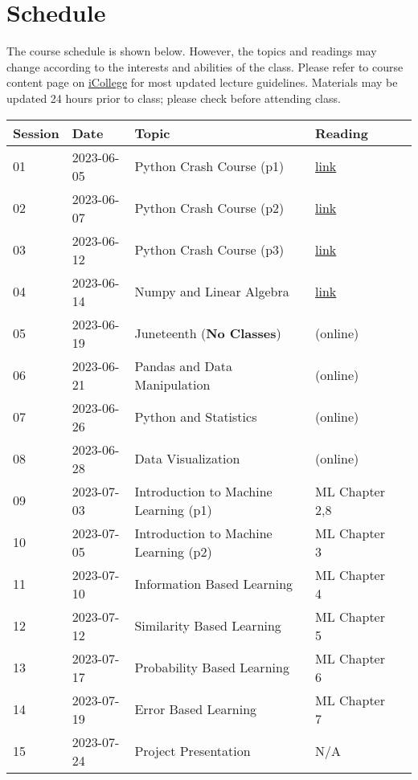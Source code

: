 \documentclass{article}
\begin{document}
\section{Schedule}
The course schedule is shown below. However, the topics and readings may change according to the interests and abilities of the class. Please refer to course content page on \href{https://gastate.view.usg.edu/d2l/home/2822689}{iCollege} for most updated lecture guidelines.  Materials may be updated 24 hours prior to class; please check before attending class.

\begin{center}
\begin{tabular}{lllll}
\hline
Session & Date  & Topic                                 & Reading \\
\hline
01       & 2023-06-05 & Python Crash Course (p1)              & \href{https://github.com/xiangshiyin/data-programming-with-python/tree/main/2023-summmer/2023-06-05}{link}\\
02       & 2023-06-07 & Python Crash Course (p2)              & \href{https://github.com/xiangshiyin/data-programming-with-python/tree/main/2023-summmer/2023-06-07}{link}\\
03       & 2023-06-12 & Python Crash Course (p3)              & \href{https://github.com/xiangshiyin/data-programming-with-python/tree/main/2023-summmer/2023-06-12}{link}\\
04       & 2023-06-14 & Numpy and Linear Algebra          & \href{https://github.com/xiangshiyin/data-programming-with-python/tree/main/2023-summmer/2023-06-14}{link}\\
05       & 2023-06-19 & Juneteenth (\textbf{No Classes})                & (online)\\
06       & 2023-06-21 & Pandas and Data Manipulation                & (online)\\
07       & 2023-06-26 & Python and Statistics                & (online)\\
08       & 2023-06-28 & Data Visualization               & (online)\\
09       & 2023-07-03 & Introduction to Machine Learning (p1) & ML Chapter 2,8\\
10       & 2023-07-05 & Introduction to Machine Learning (p2) & ML Chapter 3\\
11       & 2023-07-10 & Information Based Learning             & ML Chapter 4\\
12       & 2023-07-12 & Similarity Based Learning            & ML Chapter 5\\
13       & 2023-07-17 & Probability Based Learning                  & ML Chapter 6\\
14       & 2023-07-19 & Error Based Learning                        & ML Chapter 7\\
15       & 2023-07-24 & Project Presentation                  &N/A\\
\hline        
\end{tabular}
\end{center}
\end{document}
